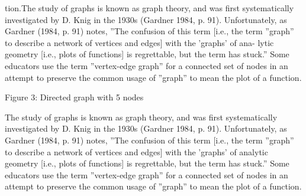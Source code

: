 \documentclass{article}
\begin{document}
tion.The study of graphs is known as graph theory, and was first systematically
investigated by D. Knig in the 1930s (Gardner 1984, p. 91). Unfortunately,
as Gardner (1984, p. 91) notes, ”The confusion of this term [i.e., the term
”graph” to describe a network of vertices and edges] with the ’graphs’ of ana-
lytic geometry [i.e., plots of functions] is regrettable, but the term has stuck.”
Some educators use the term ”vertex-edge graph” for a connected set of nodes
in an attempt to preserve the common usage of ”graph” to mean the plot of a
function.\\
\begin{center}Figure 3: Directed graph with 5 nodes
\end{center}
The study of graphs is known as graph theory, and was first systematically
investigated by D. Knig in the 1930s (Gardner 1984, p. 91). Unfortunately,
as Gardner (1984, p. 91) notes, ”The confusion of this term [i.e., the term
”graph” to describe a network of vertices and edges] with the ’graphs’ of analytic
geometry [i.e., plots of functions] is regrettable, but the term has stuck.” Some
educators use the term ”vertex-edge graph” for a connected set of nodes in an
attempt to preserve the common usage of ”graph” to mean the plot of a function.
\end{document}

